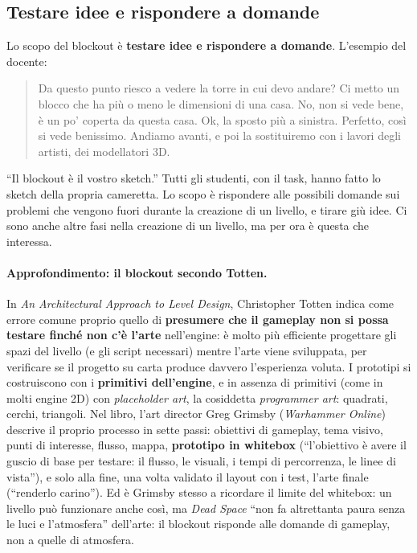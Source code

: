 \subsection{Testare idee e rispondere a domande}

Lo scopo del blockout è \textbf{testare idee e rispondere a domande}. L'esempio
del docente:
\begin{quote}
Da questo punto riesco a vedere la torre in cui devo andare? Ci metto un blocco
che ha più o meno le dimensioni di una casa. No, non si vede bene, è un po'
coperta da questa casa. Ok, la sposto più a sinistra. Perfetto, così si vede
benissimo. Andiamo avanti, e poi la sostituiremo con i lavori degli artisti,
dei modellatori 3D.
\end{quote}
``Il blockout è il vostro sketch.'' Tutti gli studenti, con il task, hanno fatto
lo sketch della propria cameretta. Lo scopo è rispondere alle possibili domande
sui problemi che vengono fuori durante la creazione di un livello, e tirare giù
idee. Ci sono anche altre fasi nella creazione di un livello, ma per ora è
questa che interessa.

\paragraph{Approfondimento: il blockout secondo Totten.} In \emph{An
Architectural Approach to Level Design}, Christopher Totten indica come errore
comune proprio quello di \textbf{presumere che il gameplay non si possa testare
finché non c'è l'arte} nell'engine: è molto più efficiente progettare gli spazi
del livello (e gli script necessari) mentre l'arte viene sviluppata, per
verificare se il progetto su carta produce davvero l'esperienza voluta. I
prototipi si costruiscono con i \textbf{primitivi dell'engine}, e in assenza di
primitivi (come in molti engine 2D) con \emph{placeholder art}, la cosiddetta
\emph{programmer art}: quadrati, cerchi, triangoli. Nel libro, l'art director
Greg Grimsby (\emph{Warhammer Online}) descrive il proprio processo in sette
passi: obiettivi di gameplay, tema visivo, punti di interesse, flusso, mappa,
\textbf{prototipo in whitebox} (``l'obiettivo è avere il guscio di base per
testare: il flusso, le visuali, i tempi di percorrenza, le linee di vista''),
e solo alla fine, una volta validato il layout con i test, l'arte finale
(``renderlo carino''). Ed è Grimsby stesso a ricordare il limite del whitebox:
un livello può funzionare anche così, ma \emph{Dead Space} ``non fa altrettanta
paura senza le luci e l'atmosfera'' dell'arte: il blockout risponde alle
domande di gameplay, non a quelle di atmosfera.

